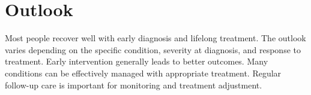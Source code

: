 \section{Outlook}
Most people recover well with early diagnosis and lifelong treatment. The outlook varies depending on the specific condition, severity at diagnosis, and response to treatment. Early intervention generally leads to better outcomes. Many conditions can be effectively managed with appropriate treatment. Regular follow-up care is important for monitoring and treatment adjustment.
